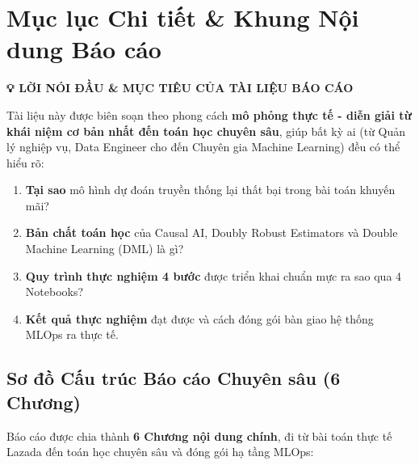 
\chapter*{Mục lục Chi tiết \& Khung Nội dung Báo cáo}

\begin{mdframed}[linecolor=lazadaorange,backgroundcolor=codebg,linewidth=1.5pt,roundcorner=5pt]
\textbf{\large 💡 LỜI NÓI ĐẦU \& MỤC TIÊU CỦA TÀI LIỆU BÁO CÁO}

Tài liệu này được biên soạn theo phong cách \textbf{mô phỏng thực tế - diễn giải từ khái niệm cơ bản nhất đến toán học chuyên sâu}, giúp bất kỳ ai (từ Quản lý nghiệp vụ, Data Engineer cho đến Chuyên gia Machine Learning) đều có thể hiểu rõ:
\begin{enumerate}[leftmargin=*]
    \item \textbf{Tại sao} mô hình dự đoán truyền thống lại thất bại trong bài toán khuyến mãi?
    \item \textbf{Bản chất toán học} của Causal AI, Doubly Robust Estimators và Double Machine Learning (DML) là gì?
    \item \textbf{Quy trình thực nghiệm 4 bước} được triển khai chuẩn mực ra sao qua 4 Notebooks?
    \item \textbf{Kết quả thực nghiệm} đạt được và cách đóng gói bàn giao hệ thống MLOps ra thực tế.
\end{enumerate}
\end{mdframed}

\vspace{0.5cm}

\section*{Sơ đồ Cấu trúc Báo cáo Chuyên sâu (6 Chương)}

Báo cáo được chia thành \textbf{6 Chương nội dung chính}, đi từ bài toán thực tế Lazada đến toán học chuyên sâu và đóng gói hạ tầng MLOps:

